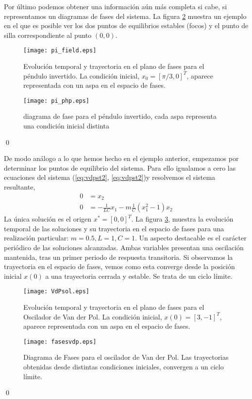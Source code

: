 \begin{example}
Por último podemos obtener una información aún más completa si cabe, si representamos un diagramas de fases del sistema.  La figura \ref{fig:piphp} muestra un ejemplo en el que es posible ver los dos puntos de equilibrios estables (focos) y el punto de silla correspondiente al punto $(0,0)$. 

 
\begin{figure}
\centering
\texttt{[image: pi\_field.eps]}
\caption{Evolución temporal y trayectoria en el plano de fases para el péndulo invertido. La condición inicial, $x_0=[\pi/3,0]^T$, aparece representada con un aspa en el espacio de fases.} \label{fig:pifield}
\end{figure}

 \begin{figure}
\centering
\texttt{[image: pi\_php.eps]}
\caption{diagrama de fase para el péndulo invertido, cada aspa representa una condición inicial distinta} \label{fig:piphp}
\end{figure}
\qed
\end{example}

\begin{example} De modo análogo a lo que hemos hecho en el ejemplo anterior, empezamos por determinar los puntos de equilibrio del sistema. Para ello igualamos a cero las ecuaciones del sistema (\ref{eq:vdpst2}, \ref{eq:vdpst2})y resolvemos el sistema resultante,
\begin{align}
0 &= x_2\\
0 &= -\frac{1}{LC}x_1 - m\frac{1}{C}(x_1^2-1)x_2 
\end{align}
La única solución es el origen $x^*=[0,0]^T$. La figura \ref{fig:vandesol}, muestra la evolución temporal de las soluciones y su trayectoria en el espacio de fases para una realización particular: $m = 0.5, L=1,C=1$. Un aspecto destacable es el carácter periódico de las soluciones alcanzadas. Ambas variables presentan una oscilación mantenida, tras un primer periodo de respuesta transitoria. Si observamos la trayectoria en el espacio de fases, vemos como esta converge desde la posición inicial $x(0)$ a una trayectoria cerrada y estable. Se trata de un ciclo límite. 

\begin{figure}
\centering
\texttt{[image: VdPsol.eps]}
\caption{Evolución temporal y trayectoria en el plano de fases para el Oscilador de Van der Pol. La condición inicial, $x(0)=[3,-1]^T$, aparece representada con un aspa en el espacio de fases.} \label{fig:vandesol}
\end{figure}

\begin{figure}
\centering
\texttt{[image: fasesvdp.eps]}
\caption{Diagrama de Fases para el oscilador de Van der Pol. Las trayectorias obtenidas desde distintas condiciones iniciales, convergen a un ciclo límite.} \label{fig:fasesvdp}
\end{figure}
\qed
\end{example}

